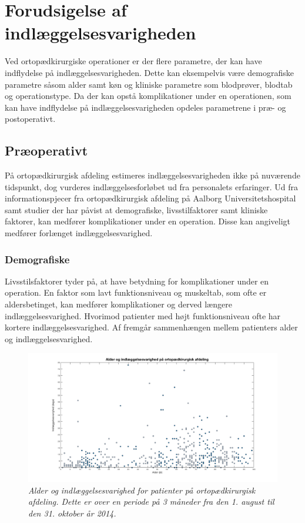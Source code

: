 \section{Forudsigelse af indlæggelsesvarigheden}
Ved ortopædkirurgiske operationer er der flere parametre, der kan have indflydelse på indlæggelsesvarigheden. Dette kan eksempelvis være demografiske parametre såsom alder samt køn og kliniske parametre som blodprøver, blodtab og operationstype. Da der kan opstå komplikationer under en operationen, som kan have indflydelse på indlæggelsesvarigheden opdeles parametrene i præ- og postoperativt.


\subsection{Præoperativt}
På ortopædkirurgisk afdeling estimeres indlæggelsesvarigheden ikke på nuværende tidspunkt, dog vurderes indlæggelsesforløbet ud fra personalets erfaringer. Ud fra informationspjecer fra ortopædkirurgisk afdeling på Aalborg Universitetshospital samt studier der har påvist at demografiske, livsstilfaktorer samt kliniske faktorer, kan medfører komplikationer under en operation. Disse kan angiveligt medfører forlænget indlæggelsesvarighed. 


\subsubsection{Demografiske}
Livsstilsfaktorer tyder på, at have betydning for komplikationer under en operation. En faktor som lavt funktionsniveau og muskeltab, som ofte er aldersbetinget, kan medfører komplikationer og derved længere indlæggelsesvarighed. Hvorimod patienter med højt funktionsniveau ofte har kortere indlæggelsesvarighed.\cite{Kehlet2001, Janssen2002} Af  fremgår sammenhængen mellem patienters alder og indlæggelsesvarighed. 


\begin{figure}[H]
	\centering
	\includegraphics[scale=0.3]{figures/alderogindlaeg}
	\caption{\textit{Alder og indlæggelsesvarighed for patienter på ortopædkirurgisk afdeling. Dette er over en periode på 3 måneder fra den 1. august til den 31. oktober år 2014.}}
	\label{alderogindlaeggelse}
\end{figure}


